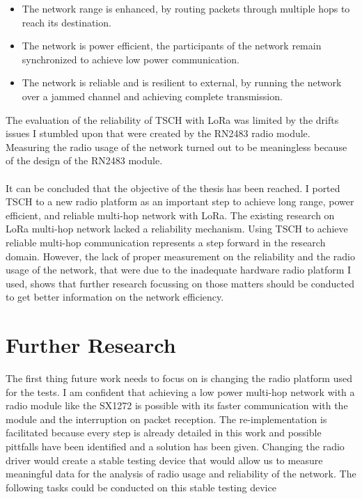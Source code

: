 \documentclass[11pt]{report}
\begin{document}
\begin{itemize}
  \item The network range is enhanced, by routing packets through multiple hops to reach
    its destination.
  \item The network is power efficient, the participants of the network remain synchronized
    to achieve low power communication.
  \item The network is reliable and is resilient to external, by running the network
    over a jammed channel and achieving complete transmission.
\end{itemize}

The evaluation of the reliability of TSCH with LoRa was limited by
the drifts issues I stumbled upon that were created by the RN2483 radio module.
Measuring the radio usage of the network turned out to be meaningless
because of the design of the RN2483 module.

\paragraph{}

It can be concluded that the objective of the thesis has been reached.
I ported TSCH to a new radio platform  as an important step to achieve long
range, power efficient, and reliable multi-hop network with LoRa.
The existing research on LoRa multi-hop network lacked a reliability mechanism.
Using TSCH to achieve reliable multi-hop communication
represents a step forward in the research domain.
However, the lack of proper measurement on the reliability and the radio usage
of the network, that were due to the inadequate hardware radio platform I used,
shows that further research focussing on those matters should
be conducted to get better information on the network efficiency.

\section*{Further Research\label{section:further}}

The first thing future work needs to focus on is changing the radio platform
used for the tests.
I am confident that achieving a low power multi-hop network with a radio module
like the SX1272 is possible with its faster communication with the module
and the interruption on packet reception.
The re-implementation is facilitated because every step is already detailed in
this work and possible pittfalls have been identified and a solution has been given.
Changing the radio driver would create a stable testing device that would allow
us to measure meaningful data for the analysis of radio usage and
reliability of the network.
The following tasks could be conducted on this stable testing device
\end{document}
